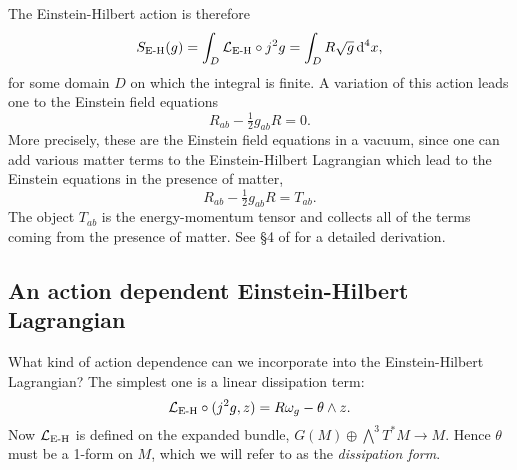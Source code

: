 \documentclass[../main.tex]{subfiles}
\begin{document}
The Einstein-Hilbert action is therefore
\begin{equation} \label{eq:EH action}
	S_{\text{E-H}}(g) = \int_D \mathcal{L}_\text{E-H} \circ j^2g = \int_D R
	\sqrt{g}\,\mathrm{d}^4x,
\end{equation}
for some domain \(D\) on which the integral is finite. 
A variation of this action leads one to the Einstein field equations 
\begin{equation} \label{eq:EFE vacuum}
	R_{ab} - \tfrac{1}{2}g_{ab}R = 0. 
\end{equation}
More precisely, these are the Einstein field equations in a vacuum, since one can add
various matter terms to the Einstein-Hilbert Lagrangian which lead to the Einstein
equations in the presence of matter,
\begin{equation} \label{eq:EFE matter}
	R_{ab} - \tfrac{1}{2}g_{ab}R = T_{ab}. 
\end{equation}
The object \( T_{ab} \) is the energy-momentum tensor and collects all of the terms coming
from the presence of matter. See \S4 of \cite{Carroll1997} for a detailed derivation.

\subsection{An action dependent Einstein-Hilbert Lagrangian}
What kind of action dependence can we incorporate into the Einstein-Hilbert Lagrangian?
The simplest one is a linear dissipation term:
\begin{equation} \label{eq:action dependent einstein-hilbert}
	\mathcal{L}_{\text{E-H}} \circ (j^2 g,z) = R\omega_g - \theta \wedge z. 
\end{equation}
Now \( \mathcal{L}_{\text{E-H}} \) is defined on the expanded bundle, \( G(M) \oplus \bigwedge^3T^\ast M \to M \). Hence \( \theta \) must be a 1-form on \(M\), which we will refer to as the \emph{dissipation form}.
\end{document}
